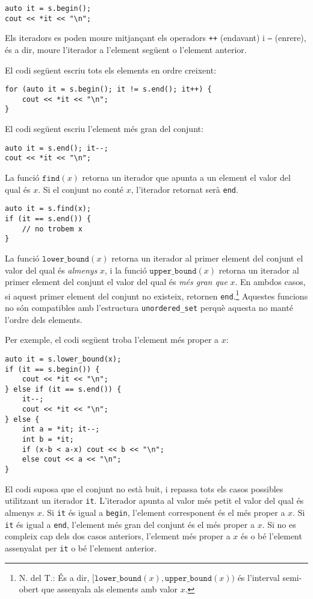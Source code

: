 \begin{lstlisting}
auto it = s.begin();
cout << *it << "\n";
\end{lstlisting}

Els iteradors es poden moure mitjançant els operadors
\texttt{++} (endavant) i \texttt{--} (enrere),
és a dir, moure l'iterador a l'element següent
o l'element anterior.

El codi següent escriu tots els elements
en ordre creixent:
\begin{lstlisting}
for (auto it = s.begin(); it != s.end(); it++) {
    cout << *it << "\n";
}
\end{lstlisting}
El codi següent escriu l'element més gran del conjunt:
\begin{lstlisting}
auto it = s.end(); it--;
cout << *it << "\n";
\end{lstlisting}

La funció $\texttt{find}(x)$ retorna un iterador
que apunta a un element el valor del qual és $x$.
Si el conjunt no conté $x$,
l'iterador retornat serà \texttt{end}.

\begin{lstlisting}
auto it = s.find(x);
if (it == s.end()) {
    // no trobem x
}
\end{lstlisting}

La funció $\texttt{lower\_bound}(x)$ retorna
un iterador al primer element del conjunt
el valor del qual és \emph{almenys} $x$, i
la funció $\texttt{upper\_bound}(x)$
retorna un iterador al primer element del conjunt
el valor del qual és \emph{més gran que} $x$.
En ambdos casos, si aquest primer element del conjunt
no existeix, retornen \texttt{end}.\footnote{N. del T.: És a dir,
$[\texttt{lower\_bound}(x), \texttt{upper\_bound}(x))$ és l'interval
semi-obert que assenyala als elements amb valor $x$.}
Aquestes funcions no són compatibles amb
l'estructura \texttt{unordered\_set} perquè aquesta
no manté l'ordre dels elements.

Per exemple, el codi següent troba l'element
més proper a $x$:

\begin{lstlisting}
auto it = s.lower_bound(x);
if (it == s.begin()) {
    cout << *it << "\n";
} else if (it == s.end()) {
    it--;
    cout << *it << "\n";
} else {
    int a = *it; it--;
    int b = *it;
    if (x-b < a-x) cout << b << "\n";
    else cout << a << "\n";
}
\end{lstlisting}

El codi suposa que el conjunt no està buit,
i repassa tots els casos possibles
utilitzant un iterador \texttt{it}.
L'iterador apunta al valor més petit
el valor del qual és almenys $x$.
Si \texttt{it} és igual a \texttt{begin},
l'element corresponent és el més proper a $x$.
Si \texttt{it} és igual a \texttt{end},
l'element més gran del conjunt és el més proper a $x$.
Si no es compleix cap dels dos casos anteriors,
l'element més proper a $x$ és o bé l'element assenyalat
per \texttt{it} o bé l'element anterior.

